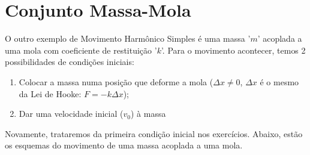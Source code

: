 \documentclass[12pt]{extarticle}
\newcommand{\<}{\langle}
\renewcommand{\>}{\rangle}
\theoremstyle{definition}
\begin{document}
\section{Conjunto Massa-Mola}
O outro exemplo de Movimento Harmônico Simples é uma massa '$m$' acoplada a uma mola com coeficiente de restituição '$k$'. Para o movimento acontecer, temos 2 possibilidades de condições iniciais:
\begin{enumerate}
    \item Colocar a massa numa posição que deforme a mola ($\Delta x \neq 0$, $\Delta x$ é o mesmo da Lei de Hooke: $F=-k\Delta x$);
    \item Dar uma velocidade inicial ($v_0$) à massa
\end{enumerate}
Novamente, trataremos da primeira condição inicial nos exercícios. Abaixo, estão os esquemas do movimento de uma massa acoplada a uma mola.
\end{document}
